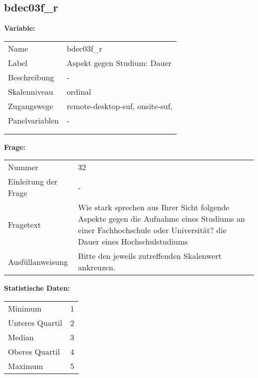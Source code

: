 	
	
	\subsection{bdec03f\_r}
	\label{subSection:bdec03f_r}

	\noindent\textbf{Variable:}\\
		\begin{tabular}{lL{11.3cm}}
			\label{tableVariable:bdec03f_r}
			Name & bdec03f\_r \\
			Label & Aspekt gegen Studium: Dauer \\
			Beschreibung & - \\
			Skalenniveau & ordinal \\
			Zugangswege &
				remote-desktop-suf,
				onsite-suf,
 \\
			Panelvariablen & -
			 \\
			 \\
 \\
		\end{tabular}

		\vspace*{1 cm}
		\noindent\textbf{Frage:}\\
		\begin{tabular}{lL{11.3cm}}
			\label{tableQuestion:bdec03f_r}
			Nummer & 32 \\
			Einleitung der Frage & - \\
			Fragetext & Wie stark sprechen aus Ihrer Sicht folgende Aspekte gegen die Aufnahme eines Studiums an einer Fachhochschule oder Universität?
die Dauer eines Hochschulstudiums \\
			Ausfüllanweisung & Bitte den jeweils zutreffenden Skalenwert ankreuzen. \\
		\end{tabular}


		\vspace*{1 cm}
		\noindent\textbf{Statistische Daten:}\\
			\begin{tabular}{ll}
				\label{tableStatistics:bdec03f_r}
					Minimum & 1 \\
					Unteres Quartil & 2 \\
					Median & 3 \\
					Oberes Quartil & 4 \\
					Maximum & 5 \\
			\end{tabular}



